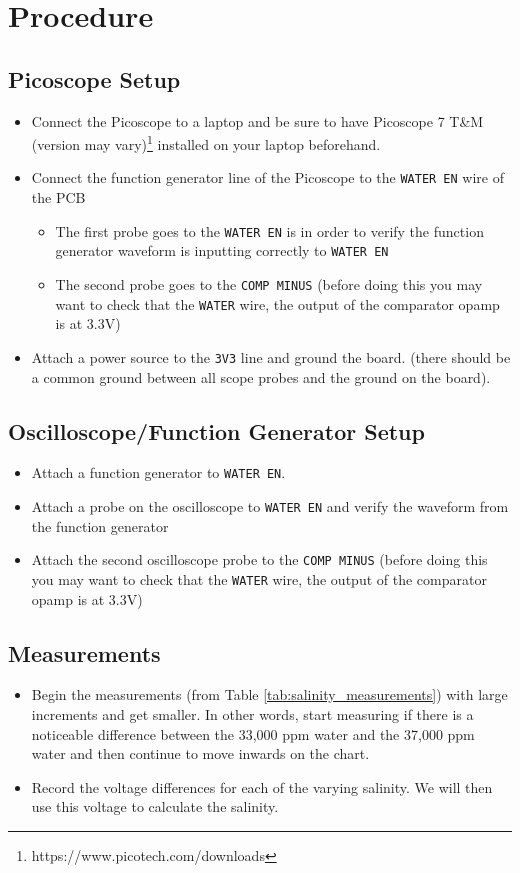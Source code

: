 \documentclass[twocolumn]{article}
\begin{document}
\section{Procedure}
\subsection{Picoscope Setup}
\begin{itemize}
    \item Connect the Picoscope to a laptop and be sure to have Picoscope 7 T\&M (version may vary)\footnote{https://www.picotech.com/downloads} installed on your laptop beforehand.
    \item Connect the function generator line of the Picoscope to the \lstinline{WATER EN} wire of the PCB
          \begin{itemize}
              \item The first probe goes to the \lstinline{WATER EN} is in order to verify the function generator waveform is inputting correctly to \lstinline{WATER EN}
              \item The second probe goes to the \lstinline{COMP MINUS} (before doing this you may want to check that the \lstinline{WATER} wire, the output of the comparator opamp is at 3.3V)
          \end{itemize}
    \item Attach a power source to the \lstinline{3V3} line and ground the board. (there should be a common ground between all scope probes and the ground on the board).
\end{itemize}

\subsection{Oscilloscope/Function Generator Setup}
\begin{itemize}
    \item Attach a function generator to \lstinline{WATER EN}.
    \item Attach a probe on the oscilloscope to \lstinline{WATER EN} and verify the waveform from the function generator
    \item Attach the second oscilloscope probe to the \lstinline{COMP MINUS} (before doing this you may want to check that the \lstinline{WATER} wire, the output of the comparator opamp is at 3.3V)
\end{itemize}

\subsection{Measurements}
\begin{itemize}
    \item Begin the measurements (from Table \ref{tab:salinity_measurements}) with large increments and get smaller. In other words, start measuring if there is a noticeable difference between the 33,000 ppm water and the 37,000 ppm water and then continue to move inwards on the chart.
    \item Record the voltage differences for each of the varying salinity. We will then use this voltage to calculate the salinity.
\end{itemize}
\end{document}
